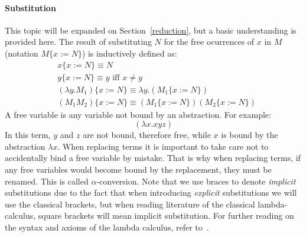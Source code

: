 \message{ !name(VU-CS-BSc-thesis-template.tex)}\documentclass[11pt]{article}
\begin{document}
\paragraph{Substitution} This topic will be expanded on Section~\ref{reduction}, but a basic understanding is provided here.
The result of substituting $N$ for the free ocurrences of $x$ in $M$ (notation $M \{ x:= N \} $) is inductively defined as:
\begin{equation*}
  \begin{split}
    & x\{ x := N \} \equiv N \\
    & y \{ x := N \} \equiv y \text{ iff } x \neq y \\
    & (\lambda y.M_{1}) \{ x:=N \} \equiv \lambda y. ( M_{1} \{ x:=N \} ) \\
    & (M_{1}M_{2}) \{ x:=N \} \equiv (M_{1}\{ x:=N \} )(M_{2} \{ x:=N \} )
  \end{split}
\end{equation*}
A free variable is any variable not bound by an abstraction. For example:
\begin{equation*}
  (\lambda x . x y z )
\end{equation*}
In this term, $y$ and $z$ are not bound, therefore free, while $x$ is bound by the abstraction $\lambda x$.
When replacing terms it is important to take care not to accidentally bind a free variable by mistake. That is why when replacing terms, if any free variables would become bound by the replacement, they must be renamed. This is called $\alpha$-conversion.
Note that we use braces to denote \textit{implicit} substitutions due to the fact that when introducing \textit{explicit} substitutions we will use the classical brackets, but when reading literature of the classical lambda-calculus, square brackets will mean implicit substitution.
For further reading on the syntax and axioms of the lambda calculus, refer to~\cite{barendregt1984lambda}.
\end{document}
